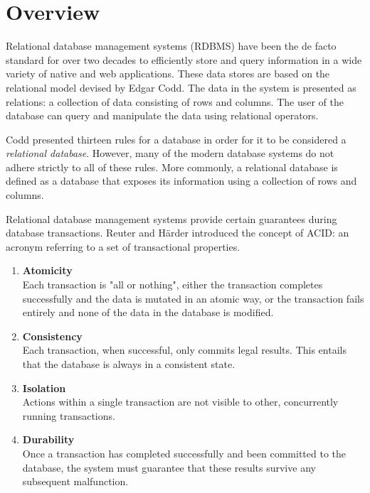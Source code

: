 \section{Overview}
\label{sec:overview}

Relational database management systems (RDBMS) have been the de facto standard for over two decades to efficiently store and query information in a wide variety of native and web applications. These data stores are based on the relational model devised by Edgar Codd. The data in the system is presented as relations: a collection of data consisting of rows and columns. The user of the database can query and manipulate the data using relational operators.

Codd presented thirteen rules for a database in order for it to be considered a \textit{relational database}. However, many of the modern database systems do not adhere strictly to all of these rules. More commonly, a relational database is defined as a database that exposes its information using a collection of rows and columns.

Relational database management systems provide certain guarantees during database transactions. Reuter and Härder introduced the concept of ACID: an acronym referring to a set of transactional properties.

\begin{enumerate}
  \item \textbf{Atomicity} \\ Each transaction is "all or nothing", either the transaction completes successfully and the data is mutated in an atomic way, or the transaction fails entirely and none of the data in the database is modified.
  \item \textbf{Consistency} \\ Each transaction, when successful, only commits legal results. This entails that the database is always in a consistent state.
  \item \textbf{Isolation} \\ Actions within a single transaction are not visible to other, concurrently running transactions.
  \item \textbf{Durability} \\ Once a transaction has completed successfully and been committed to the database, the system must guarantee that these results survive any subsequent malfunction.
\end{enumerate}


